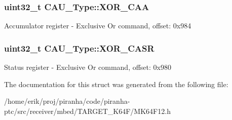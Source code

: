 \subsubsection[{\texorpdfstring{X\+O\+R\+\_\+\+C\+AA}{XOR_CAA}}]{ uint32\+\_\+t C\+A\+U\+\_\+\+Type\+::\+X\+O\+R\+\_\+\+C\+AA}\hypertarget{structCAU__Type_ad7fe03764336da7e3a8ff7b4e0fd217a}{}\label{structCAU__Type_ad7fe03764336da7e3a8ff7b4e0fd217a}
Accumulator register -\/ Exclusive Or command, offset\+: 0x984 
\subsubsection[{\texorpdfstring{X\+O\+R\+\_\+\+C\+A\+SR}{XOR_CASR}}]{ uint32\+\_\+t C\+A\+U\+\_\+\+Type\+::\+X\+O\+R\+\_\+\+C\+A\+SR}\hypertarget{structCAU__Type_af9f78dbcf81a0ed3afb44e959c77b1bc}{}\label{structCAU__Type_af9f78dbcf81a0ed3afb44e959c77b1bc}
Status register -\/ Exclusive Or command, offset\+: 0x980 

The documentation for this struct was generated from the following file\+:\begin{DoxyCompactItemize}
\item 
/home/erik/proj/piranha/code/piranha-\/ptc/src/receiver/mbed/\+T\+A\+R\+G\+E\+T\+\_\+\+K64\+F/M\+K64\+F12.\+h\end{DoxyCompactItemize}
